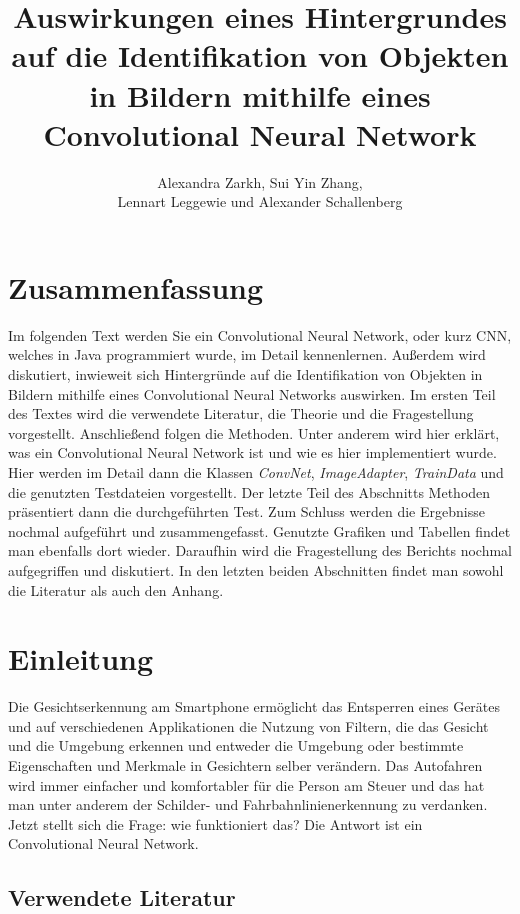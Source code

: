 \documentclass[paper=A4,pagesize=auto,12pt,headinclude=true,footinclude=true,BCOR=0mm,DIV=calc]{scrartcl}
\title{Auswirkungen eines Hintergrundes auf die Identifikation von Objekten in Bildern mithilfe eines Convolutional Neural Network}
\author{Alexandra Zarkh, Sui Yin Zhang,\\ Lennart Leggewie und Alexander Schallenberg}
\begin{document}
\begin{titlepage}
	\maketitle
\end{titlepage}

\tableofcontents
\newpage


\section{Zusammenfassung}
Im folgenden Text werden Sie ein Convolutional Neural Network, oder kurz CNN, welches in Java programmiert wurde, im Detail kennenlernen. Außerdem wird diskutiert, inwieweit  sich Hintergründe auf die Identifikation von Objekten in Bildern mithilfe eines Convolutional Neural Networks auswirken.
Im ersten Teil des Textes wird die verwendete Literatur, die Theorie und die Fragestellung vorgestellt. Anschließend folgen die Methoden. Unter anderem wird hier erklärt, was ein Convolutional Neural Network ist und wie es hier implementiert wurde. Hier werden im Detail dann die Klassen \textit{ConvNet}, \textit{ImageAdapter}, \textit{TrainData} und die genutzten Testdateien vorgestellt. Der letzte Teil des Abschnitts Methoden präsentiert dann die durchgeführten Test.
Zum Schluss werden die Ergebnisse nochmal aufgeführt und zusammengefasst. Genutzte Grafiken und Tabellen findet man ebenfalls dort wieder. Daraufhin wird die Fragestellung des Berichts nochmal aufgegriffen und diskutiert. In den letzten beiden Abschnitten findet man sowohl die Literatur als auch den Anhang.


\section{Einleitung} %
Die Gesichtserkennung am Smartphone ermöglicht das Entsperren eines Gerätes und auf verschiedenen Applikationen die Nutzung von Filtern, die das Gesicht und die Umgebung erkennen und entweder die Umgebung oder bestimmte Eigenschaften und Merkmale in Gesichtern selber verändern.
Das Autofahren wird immer einfacher und komfortabler für die Person am Steuer und das hat man unter anderem der Schilder- und Fahrbahnlinienerkennung zu verdanken. Jetzt stellt sich die Frage: wie funktioniert das? Die Antwort ist ein Convolutional Neural Network.

\subsection{Verwendete Literatur}
\end{document}
